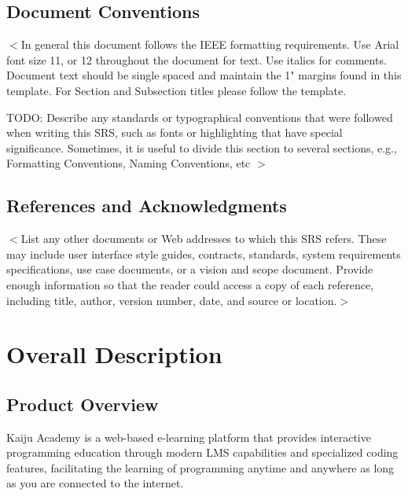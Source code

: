 \documentclass[a4paper, 11pt]{scrreprt}
\begin{document}
\section{Document Conventions}
$<$In general this document follows the IEEE formatting requirements. Use Arial font size 11, or 12 throughout the document for text. Use italics for comments. Document text should be single spaced and maintain the 1" margins found in this template. For Section and Subsection titles please follow the template. 

TODO: Describe any standards or typographical conventions that were followed when writing this SRS, such as fonts or highlighting that have special significance. Sometimes, it is useful to divide this section to several sections, e.g., Formatting Conventions, Naming Conventions, etc
$>$

\section{References and Acknowledgments}
$<$List any other documents or Web addresses to which this SRS refers. These may 
include user interface style guides, contracts, standards, system requirements 
specifications, use case documents, or a vision and scope document. Provide 
enough information so that the reader could access a copy of each reference, 
including title, author, version number, date, and source or location.$>$


\chapter{Overall Description}
\section{Product Overview}

Kaiju Academy is a web-based e-learning platform that provides interactive programming education through modern LMS capabilities and specialized coding features, facilitating the learning of programming anytime and anywhere as long as you are connected to the internet.\\
\end{document}
